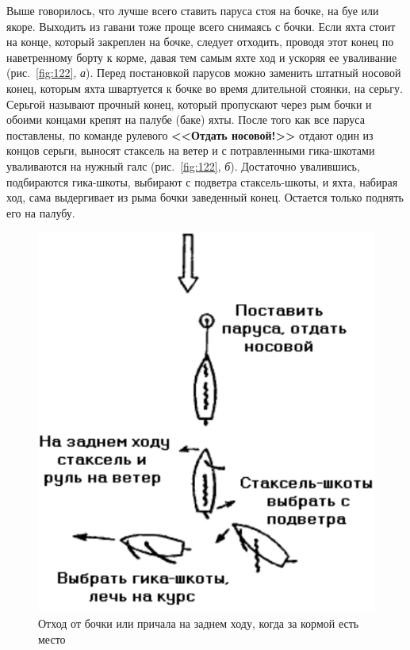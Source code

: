 \documentclass[a4paper, 12pt, twoside, final]{scrbook}
\begin{document}
Выше говорилось, что лучше всего ставить паруса стоя на бочке, на буе или якоре. Выходить из гавани тоже проще всего снимаясь с бочки. Если яхта стоит на конце, который закреплен на бочке, следует отходить, проводя этот конец по наветренному борту к корме, давая тем самым яхте ход и ускоряя ее уваливание (рис.~\ref{fig:122}, \textit{а}). Перед постановкой парусов можно заменить штатный носовой конец, которым яхта швартуется к бочке во время длительной стоянки, на серьгу. Серьгой называют прочный конец, который пропускают через рым бочки и обоими концами крепят на палубе (баке) яхты. После того как все паруса поставлены, по команде рулевого \textbf{<<Отдать носовой!>>} отдают один из концов серьги, выносят стаксель на ветер и с потравленными гика-шкотами уваливаются на нужный галс (рис.~\ref{fig:122}, \textit{б}). Достаточно увалившись, подбираются гика-шкоты, выбирают с подветра стаксель-шкоты, и яхта, набирая ход, сама выдергивает из рыма бочки заведенный конец. Остается только поднять его на палубу.

\begin{figure}
	\centering
	\includegraphics[scale=1]{123_Othod_ot_bochki}
	\caption{Отход от бочки или причала на заднем ходу, когда за кормой есть место}
	\label{fig:123}
\end{figure}
\end{document}
